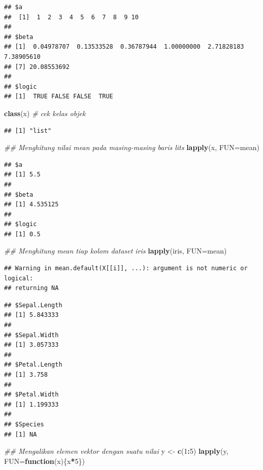 \documentclass[]{book}
\newenvironment{Shaded}{\begin{snugshade}}{\end{snugshade}}
\newcommand{\CommentTok}[1]{\textcolor[rgb]{0.56,0.35,0.01}{\textit{#1}}}
\newcommand{\ControlFlowTok}[1]{\textcolor[rgb]{0.13,0.29,0.53}{\textbf{#1}}}
\newcommand{\DataTypeTok}[1]{\textcolor[rgb]{0.13,0.29,0.53}{#1}}
\newcommand{\DecValTok}[1]{\textcolor[rgb]{0.00,0.00,0.81}{#1}}
\newcommand{\KeywordTok}[1]{\textcolor[rgb]{0.13,0.29,0.53}{\textbf{#1}}}
\newcommand{\NormalTok}[1]{#1}
\newcommand{\OperatorTok}[1]{\textcolor[rgb]{0.81,0.36,0.00}{\textbf{#1}}}
\newcommand{\StringTok}[1]{\textcolor[rgb]{0.31,0.60,0.02}{#1}}
\theoremstyle{definition}
\theoremstyle{definition}
\theoremstyle{definition}
\theoremstyle{remark}
\begin{document}
\begin{verbatim}
## $a
##  [1]  1  2  3  4  5  6  7  8  9 10
## 
## $beta
## [1]  0.04978707  0.13533528  0.36787944  1.00000000  2.71828183  7.38905610
## [7] 20.08553692
## 
## $logic
## [1]  TRUE FALSE FALSE  TRUE
\end{verbatim}

\begin{Shaded}
\begin{Highlighting}[]
\KeywordTok{class}\NormalTok{(x) }\CommentTok{# cek kelas objek}
\end{Highlighting}
\end{Shaded}

\begin{verbatim}
## [1] "list"
\end{verbatim}

\begin{Shaded}
\begin{Highlighting}[]
\CommentTok{## Menghitung nilai mean pada masing-masing baris lits}
\KeywordTok{lapply}\NormalTok{(x, }\DataTypeTok{FUN=}\NormalTok{mean)}
\end{Highlighting}
\end{Shaded}

\begin{verbatim}
## $a
## [1] 5.5
## 
## $beta
## [1] 4.535125
## 
## $logic
## [1] 0.5
\end{verbatim}

\begin{Shaded}
\begin{Highlighting}[]
\CommentTok{## Menghitung mean tiap kolom dataset iris}
\KeywordTok{lapply}\NormalTok{(iris, }\DataTypeTok{FUN=}\NormalTok{mean)}
\end{Highlighting}
\end{Shaded}

\begin{verbatim}
## Warning in mean.default(X[[i]], ...): argument is not numeric or logical:
## returning NA
\end{verbatim}

\begin{verbatim}
## $Sepal.Length
## [1] 5.843333
## 
## $Sepal.Width
## [1] 3.057333
## 
## $Petal.Length
## [1] 3.758
## 
## $Petal.Width
## [1] 1.199333
## 
## $Species
## [1] NA
\end{verbatim}

\begin{Shaded}
\begin{Highlighting}[]
\CommentTok{## Mengalikan elemen vektor dengan suatu nilai}
\NormalTok{y <-}\StringTok{ }\KeywordTok{c}\NormalTok{(}\DecValTok{1}\OperatorTok{:}\DecValTok{5}\NormalTok{)}
\KeywordTok{lapply}\NormalTok{(y, }\DataTypeTok{FUN=}\ControlFlowTok{function}\NormalTok{(x)\{x}\OperatorTok{*}\DecValTok{5}\NormalTok{\})}
\end{Highlighting}
\end{Shaded}
\end{document}
